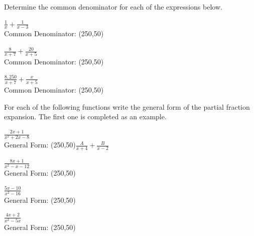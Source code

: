 \begin{problem}
\item Determine the common denominator for each of the expressions below.
  \begin{subproblem}
    \item ${\displaystyle \frac{1}{x} + \frac{1}{x-3}}$ \\
      Common Denominator: \framebox(250,50){~}
      \vfill
    \item ${\displaystyle \frac{8}{x+7} + \frac{20}{x+5}}$ \\
      Common Denominator: \framebox(250,50){~}
      \vfill
    \item ${\displaystyle \frac{8,250}{x+7} + \frac{x}{x+5}}$ \\
      Common Denominator: \framebox(250,50){~}
      \vfill
  \end{subproblem}

  \clearpage

\item For each of the following functions write the general form of
  the partial fraction expansion. The first one is completed as an
  example.
  \begin{subproblem}
    \item ${\displaystyle \frac{2x+1}{x^2+2x-8}}$ \\
      General Form: \framebox(250,50){$\frac{A}{x+4} + \frac{B}{x-2}$}
    \item ${\displaystyle \frac{8x+1}{x^2-x-12}}$ \\
      General Form: \framebox(250,50){~}
      \vfill
    \item ${\displaystyle \frac{5x-10}{x^2-16}}$ \\
      General Form: \framebox(250,50){~}
      \vfill
    \item ${\displaystyle \frac{4x+2}{x^2-5x}}$ \\
      General Form: \framebox(250,50){~}
      \vfill
  \end{subproblem}

  \clearpage


\end{problem}
